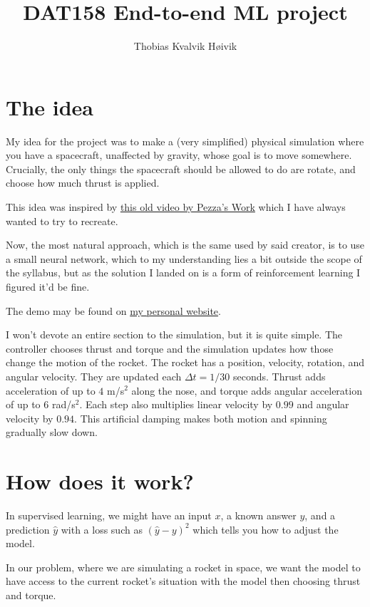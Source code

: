 \documentclass[12pt, letterpaper]{article}
\title{DAT158 End-to-end ML project}
\author{Thobias Kvalvik H{\o}ivik}
\date{}
\begin{document}
\maketitle

\section{The idea}

My idea for the project was to make 
a (very simplified) physical simulation where 
you have a spacecraft, unaffected by gravity, 
whose goal is to move somewhere. Crucially, the 
only things the spacecraft should be allowed to do 
are rotate, and choose how much thrust is applied. 

This idea was inspired by 
\href{https://www.youtube.com/watch?v=L8XkPfY-jc8}{this old video by Pezza's Work}
which I have always wanted to try to recreate. 

Now, the most natural approach, which is 
the same used by said creator, is to use a small neural network, 
which to my understanding lies a bit outside the scope 
of the syllabus, but as the solution I landed 
on is a form of reinforcement learning I figured 
it'd be fine. 

The demo may be found on \href{https://thobiashoivik.com/lab/rocket-reinforcement-learning}{my personal website}.

I won't devote an entire section to 
the simulation, but it is quite simple. 
The controller chooses thrust and torque and the 
simulation updates how those change the 
motion of the rocket. 
The rocket has a position, velocity, rotation, 
and angular velocity. 
They are updated each $\Delta t = 1/30$ seconds.
Thrust adds acceleration of up to $4$ m/s$^2$ along the nose,
and torque adds angular acceleration of up to $6$ rad/s$^2$.
Each step also multiplies linear velocity by $0.99$ and
angular velocity by $0.94$. This artificial damping makes
both motion and spinning gradually slow down.

\section{How does it work?}

In supervised learning, we might have 
an input $x$, a known answer $y$, and a prediction 
$\widehat y$ with a loss such as 
$(\widehat y - y)^2$ which tells you how to 
adjust the model. 

In our problem, where we are 
simulating a rocket in space, 
we want the model to have access 
to the current rocket's situation with 
the model then choosing thrust and torque. 
\end{document}
